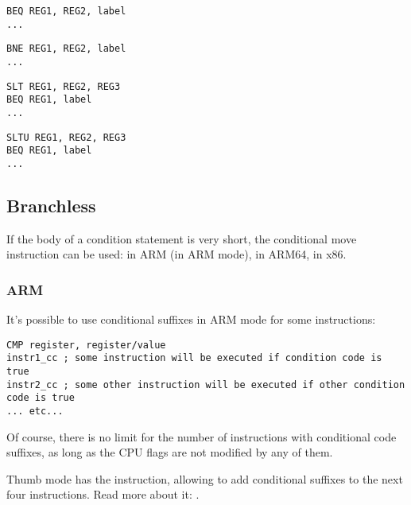 \begin{lstlisting}[caption=Check for equal values]
BEQ REG1, REG2, label
...
\end{lstlisting}

\begin{lstlisting}[caption=Check for non-equal values]
BNE REG1, REG2, label
...
\end{lstlisting}

\begin{lstlisting}[caption=Check for less than{,} greater than (signed)]
SLT REG1, REG2, REG3
BEQ REG1, label
...
\end{lstlisting}

\begin{lstlisting}[caption=Check for less than{,} greater than (unsigned)]
SLTU REG1, REG2, REG3
BEQ REG1, label
...
\end{lstlisting}

\subsection{Branchless}

If the body of a condition statement is very short, the conditional move instruction can be used: 
 in ARM (in ARM mode),  in ARM64,  in x86.

\subsubsection{ARM}

It's possible to use conditional suffixes in ARM mode for some instructions:

\begin{lstlisting}[caption=ARM (\ARMMode)]
CMP register, register/value
instr1_cc ; some instruction will be executed if condition code is true
instr2_cc ; some other instruction will be executed if other condition code is true
... etc...
\end{lstlisting}

Of course, there is no limit for the number of instructions with conditional code suffixes, 
as long as the CPU flags are not modified by any of them.


Thumb mode has the  instruction, allowing to add conditional suffixes to the next four instructions.
Read more about it: .

